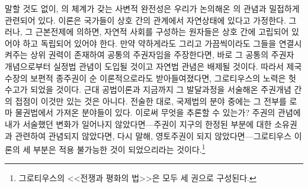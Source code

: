말할 것도 없이,
의 체계가 갖는 사변적 완전성은 우리가 논의해온
의 관념과 밀접하게 관련되어 있다.
 이론은 국가들이 상호 간의 관계에서 자연상태에 있다고 가정한다.
그러나,
그 근본전제에 의하면,
자연적 사회를 구성하는 원자들은
상호 간에 고립되어 있어야 하고
독립되어 있어야 한다.
만약
약하게라도 그리고 가끔씩이라도
그들을 연결시켜주는 상위 권력이 존재하여
공통의 주권자임을 주장한다면,
바로 그 공통의 주권자 개념으로부터 실정법 관념이 도입될 것이고
자연법 관념은 배제될 것이다.
따라서 제국 수장의 보편적 종주권이
순 이론적으로라도 받아들여졌다면, 그로티우스의 노력은 헛수고가 되었을 것이다.
근대 공법이론과 지금까지 그 발달과정을 서술해온 주권개념 간의 접점이
이것만 있는 것은 아니다.
전술한 대로, 국제법의 분야 중에는
그 전부를 로마 물권법에서 가져온 분야들이 있다.
이로써 무엇을 추론할 수 있는가?
주권의 관념에 내가 서술했던 변화가 일어나지 않았다면---주권이
지구의 한정된 부분에 대한 소유권과 관련하여 관념되지 않았다면,
다시 말해, 영토주권이 되지 않았다면---그로티우스 이론의 세 부분은
적용 불가능한 것이 되었으리라는 것이다.\footnote{그로티우스의
<<전쟁과 평화의 법>>은 모두 세 권으로 구성된다.}

